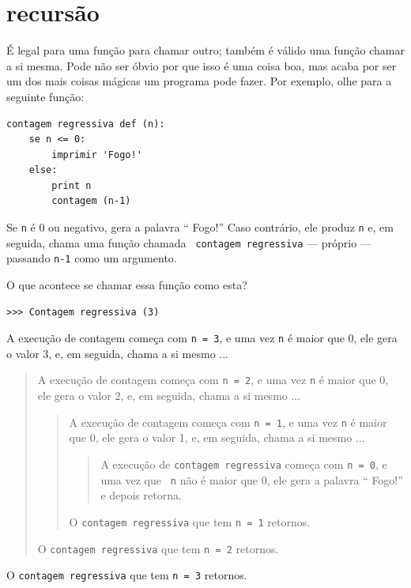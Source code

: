 \documentclass[10pt]{book}
\begin{document}
{\section{recursão}
\label{recursão}

É legal para uma função para chamar outro;
também é válido uma função chamar a si mesma. Pode não ser óbvio
por que isso é uma coisa boa, mas acaba por ser um dos mais
coisas mágicas um programa pode fazer.
Por exemplo, olhe para a seguinte função:

\begin{verbatim}
contagem regressiva def (n):
    se n <= 0:
        imprimir 'Fogo!'
    else:
        print n
        contagem (n-1)
\end{verbatim}
%
Se {\tt n} é 0 ou negativo, gera a palavra `` Fogo!''
Caso contrário, ele produz {\tt n} e, em seguida, chama uma função chamada {\tt
contagem regressiva} --- próprio --- passando {\tt n-1} como um argumento.

O que acontece se chamar essa função como esta?

\begin{verbatim}
>>> Contagem regressiva (3)
\end{verbatim}
%
A execução de {\tt} contagem começa com {\tt n = 3}, e uma vez
{\tt n} é maior que 0, ele gera o valor 3, e, em seguida, chama a si mesmo ...

\begin{quote}
A execução de {\tt} contagem começa com {\tt n = 2}, e uma vez
{\tt n} é maior que 0, ele gera o valor 2, e, em seguida, chama a si mesmo ...

\begin{quote}
A execução de {\tt} contagem começa com {\tt n = 1}, e uma vez
{\tt n} é maior que 0, ele gera o valor 1, e, em seguida, chama a si mesmo ...

\begin{quote}
A execução de {\tt contagem regressiva} começa com {\tt n = 0}, e uma vez que {\tt
n} não é maior que 0, ele gera a palavra `` Fogo!'' e depois
retorna.
\end{quote}

O {\tt contagem regressiva} que tem {\tt n = 1} retornos.
\end{quote}

O {\tt contagem regressiva} que tem {\tt n = 2} retornos.
\end{quote}

O {\tt contagem regressiva} que tem {\tt n = 3} retornos.

}
\end{document}
